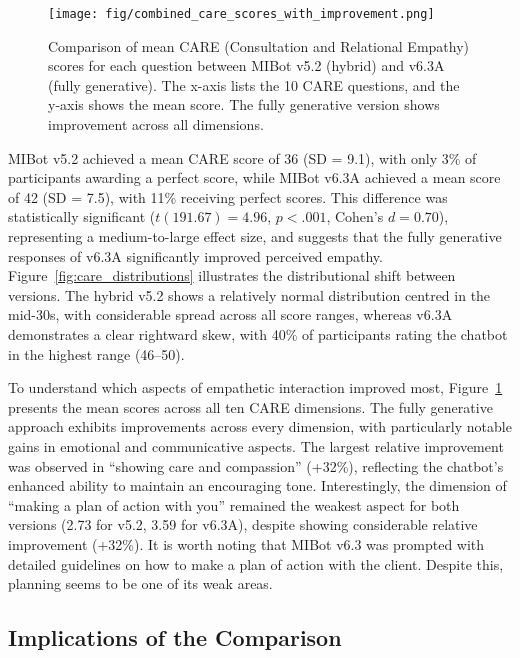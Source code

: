 \begin{figure}[htbp]
    \centering
    \texttt{[image: fig/combined\_care\_scores\_with\_improvement.png]}
    \caption[Comparison of Mean CARE Scores per Question]{Comparison of mean CARE (Consultation and Relational Empathy) scores for each question between MIBot v5.2 (hybrid) and v6.3A (fully generative). The x-axis lists the 10 CARE questions, and the y-axis shows the mean score. The fully generative version shows improvement across all dimensions.}
    \label{fig:care_questions}
\end{figure}

 MIBot v5.2 achieved a mean CARE score of 36 (SD = 9.1), with only 3\% of participants awarding a perfect score, while MIBot v6.3A achieved a mean score of 42 (SD = 7.5), with 11\% receiving perfect scores. This difference was statistically significant ($t(191.67) = 4.96$, $p < .001$, Cohen's $d = 0.70$), representing a medium-to-large effect size, and suggests that the fully generative responses of v6.3A significantly improved perceived empathy. Figure~\ref{fig:care_distributions} illustrates the distributional shift between versions. The hybrid v5.2 shows a relatively normal distribution centred in the mid-30s, with considerable spread across all score ranges, whereas v6.3A demonstrates a clear rightward skew, with 40\% of participants rating the chatbot in the highest range (46--50).

To understand which aspects of empathetic interaction improved most, Figure~\ref{fig:care_questions} presents the mean scores across all ten CARE dimensions. The fully generative approach exhibits improvements across every dimension, with particularly notable gains in emotional and communicative aspects. The largest relative improvement was observed in ``showing care and compassion'' (+32\%), reflecting the chatbot's enhanced ability to maintain an encouraging tone. Interestingly, the dimension of ``making a plan of action with you'' remained the weakest aspect for both versions (2.73 for v5.2, 3.59 for v6.3A), despite showing considerable relative improvement (+32\%). It is worth noting that MIBot v6.3 was prompted with detailed guidelines on how to make a plan of action with the client. Despite this, planning seems to be one of its weak areas.



\subsection*{Implications of the Comparison}


